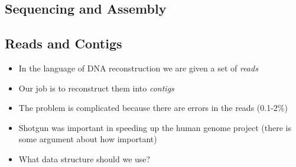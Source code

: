 
\begin{slide}
\section[-1]{Sequencing and Assembly}
\pause
\pb
{}
\begin{center}
  \pause
\end{center}

\end{slide}


\begin{slide}
\section{Reads and Contigs}

\begin{PauseHighLight}
  \begin{itemize}
  \item In the language of DNA reconstruction we are given a set of
    \emph{reads}\pause
  \item Our job is to reconstruct them into \emph{contigs}\pause
  \item The problem is complicated because there are errors in the reads
    (0.1-2\%)\pause
  \item Shotgun was important in speeding up the human genome project
    (there is some argument about how important)\pause
  \item What data structure should we use?\pause
  \end{itemize}
\end{PauseHighLight}

\end{slide}


\Outline %

